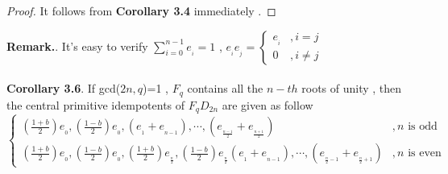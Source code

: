 \documentclass{article}
\begin{document}
\begin{proof}
    It follows from \textbf{Corollary 3.4} immediately .
\end{proof}
\textbf{Remark.}. It's easy to verify $\sum\limits_{i=0}^{n-1}e_{_i}=1$ , 
$
e_{_i}e_{_j} = \left\{
\begin{array}{ll}
e_{_i} & ,i=j  \\
0 & ,i\neq j
\end{array}
\right.
$\\
\quad\\
\textbf{Corollary 3.6}. If gcd($2n,q$)=1 , $F_q$ contains all the $n-th$ roots of unity , then the central primitive idempotents of $F_qD_{2n}$ are given as follow
\begin{equation}
   \begin{cases}
   (\frac{1+b}{2})e_{_0},(\frac{1-b}{2})e_{_0},(e_{_1}+e_{_{n-1}}),\cdots,(e_{_{\frac{n-1}{2}}}+e_{_{\frac{n+1}{2}}}) & ,\text{$n$ is odd}\\
   (\frac{1+b}{2})e_{_0},(\frac{1-b}{2})e_{_0},(\frac{1+b}{2})e_{_{\frac{n}{2}}},(\frac{1-b}{2})e_{_{\frac{n}{2}}}(e_{_1}+e_{_{n-1}}),\cdots,(e_{_{\frac{n}{2}-1}}+e_{_{\frac{n}{2}+1}}) & ,\text{$n$ is even}
   \end{cases}
\end{equation}
\end{document}
